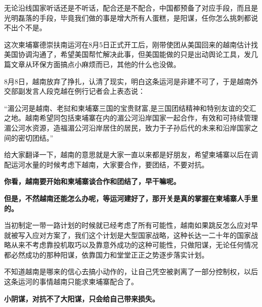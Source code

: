 \documentclass[UTF8, 11pt, oneside]{ctexart}
\newcommand{\zd}[1]{\textbf{\textcolor[RGB]{123,12,0}{#1}}} %
\newcommand{\yh}[1]{%
    \begin{tcolorbox}[enhanced,
        frame hidden, interior hidden,
        before skip = 5mm, left skip=10mm,
        borderline west={5pt}{0pt}{gray!50}]
        #1
    \end{tcolorbox}
}
\begin{document}
无论沿线国家听话还是不听话，配合还是不配合，中国都预备了对应手段，而且是光明磊落的手段，毕竟我们做的事是增大所有人蛋糕，是阳谋，任你怎么挑刺都说不出个不是。

这次柬埔寨德崇扶南运河在8月5日正式开工后，刚带使团从美国回来的越南估计找美国协调沟通了，希望美国帮忙解决此事，但美国能做的只是出动舆论工具，发几篇文章从环保方面搞点小麻烦而已，其他的什么也没做。

8月8日，越南放弃了挣扎，认清了现实，明白这条运河是非建不可了，于是越南外交部副发言人段克越在例行记者会上表态说：

\yh{ “湄公河是越南、老挝和柬埔寨三国的宝贵财富,是三国团结精神和特别友谊的交汇之地。越南希望同包括柬埔寨在内的湄公河沿岸国家一起合作，有效和可持续管理湄公河水资源，造福湄公河沿岸居住的居民，致力于子孙后代的未来和沿岸国家之间的密切团结。”}

给大家翻译一下，越南的意思就是大家一直以来都是好朋友，希望柬埔寨以后在调配运河水量的时候考虑下越南，大家要合作，要团结，不要对抗。

\zd{你看，越南要开始和柬埔寨谈合作和团结了，早干嘛呢。}

\zd{但是，不然越南还能怎么办呢，等运河建好了，那开关是真的掌握在柬埔寨人手里的。}

当初制定一带一路计划的时候就已经考虑了所有可能性，越南如果跳反怎么应对早就被写入应对方案了，我们这个计划是大型国家战略，这种长达一二十年的国家战略从来不考虑靠投机取巧以及靠意外成功的这种可能性，只做阳谋，无论任何情况都必然成功的那种阳谋，依靠国力和堂堂正正之势逐步落实计划。

不知道越南是哪来的信心去搞小动作的，让自己凭空被剥离了一部分控制权，以后这条运河的事情越南只能求柬埔寨配合了。

\zd{小阴谋，对抗不了大阳谋，只会给自己带来损失。}
\end{document}
